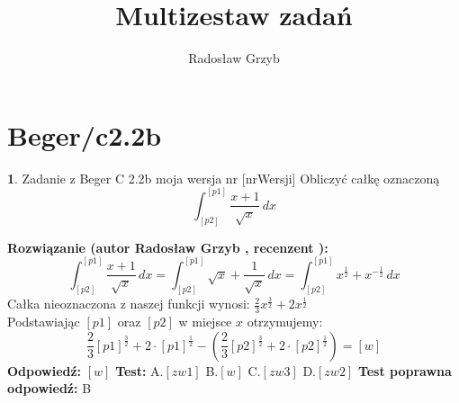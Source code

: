 \documentclass[12pt, a4paper]{article}
\title{Multizestaw zadań}
\author{Radosław Grzyb}
\date{}
\theoremstyle{definition} %
\newtheorem{zad}{}
\newcommand{\kategoria}[1]{\section{#1}} %
\newcommand{\zadStart}[1]{\begin{zad}#1\newline} %
\newcommand{\zadStop}{\end{zad}}   %
\newcommand{\rozwStart}[2]{\noindent \textbf{Rozwiązanie (autor #1 , recenzent #2): }\newline} %
\newcommand{\rozwStop}{\newline}                                            %
\newcommand{\odpStart}{\noindent \textbf{Odpowiedź:}\newline}    %
\newcommand{\odpStop}{\newline}                                             %
\newcommand{\testStart}{\noindent \textbf{Test:}\newline} %
\newcommand{\testStop}{\newline} %
\newcommand{\kluczStart}{\noindent \textbf{Test poprawna odpowiedź:}\newline} %
\newcommand{\kluczStop}{\newline} %
\begin{document}
\maketitle
\kategoria{Beger/c2.2b}
\zadStart{Zadanie z Beger C 2.2b moja wersja nr [nrWersji]}
Obliczyć całkę oznaczoną
$$\int_{[p2]}^{[p1]} \frac{x+1}{\sqrt{x}} \,dx$$
\zadStop
\rozwStart{Radosław Grzyb}{}
$$\int_{[p2]}^{[p1]} \frac{x+1}{\sqrt{x}} \,dx = \int_{[p2]}^{[p1]} \sqrt{x}+\frac{1}{\sqrt{x}} \,dx = \int_{[p2]}^{[p1]} x^{\frac{1}{2}}+x^{-\frac{1}{2}} \,dx$$
Całka nieoznaczona z naszej funkcji wynosi: $\frac{2}{3}x^{\frac{3}{2}}+2x^{\frac{1}{2}}$\\
Podstawiając $[p1]$ oraz $[p2]$ w miejsce $x$ otrzymujemy:
$$\frac{2}{3}[p1]^{\frac{3}{2}}+2\cdot[p1]^{\frac{1}{2}}-(\frac{2}{3}[p2]^{\frac{3}{2}}+2\cdot[p2]^{\frac{1}{2}})=[w]$$
\rozwStop
\odpStart
$[w]$
\odpStop
\testStart
A.$[zw1]$
B.$[w]$
C.$[zw3]$
D.$[zw2]$
\testStop
\kluczStart
B
\kluczStop
\end{document}
